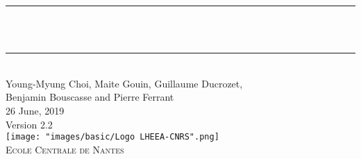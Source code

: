 
\fancyhf{}
\cfoot{\thepage}

\makeatletter
\let\thetitle\@title
\let\theauthor\@author
\let\thedate\@date
\makeatother


\begin{titlepage}
	\centering
    \vspace*{0.5 cm}    

	\rule{\linewidth}{0.2 mm} \\[0.8 cm]
	{ \huge \bfseries \thetitle}\\[0.3 cm]
	\rule{\linewidth}{0.2 mm} \\[0.8 cm]
	\textup{\large Young-Myung Choi, Maite Gouin, Guillaume Ducrozet, }\\[0.5 cm]		
	\textup{\large Benjamin Bouscasse and Pierre Ferrant}\\[1.0 cm]		
	
	\large{26 June, 2019} \\[0.5cm]	
	\large{Version 2.2} \\[4.0cm]

	\texttt{[image: "images/basic/Logo LHEEA-CNRS".png]}  \\[1.5 cm]
	
	 \textsc{\LARGE Ecole Centrale de Nantes}\\[1.0 cm]	%
	 
\end{titlepage}